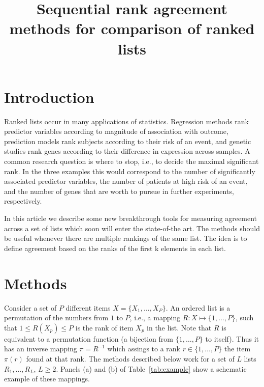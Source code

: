 \documentclass[12pt,a4paper]{article}\usepackage[]{graphicx}\usepackage[]{color}
\begin{document}

\title{Sequential rank agreement methods for comparison of ranked lists}
\author{}

\maketitle

\begin{abstract}

\end{abstract}

\section{Introduction}

Ranked lists occur in many applications of statistics. Regression
methods rank predictor variables according to magnitude of association
with outcome, prediction models rank subjects according to their risk
of an event, and genetic studies rank genes according to their
difference in expression across samples. A common research question is
where to stop, i.e., to decide the maximal significant rank.  In the
three examples this would correspond to the number of significantly
associated predictor variables, the number of patients at high risk of
an event, and the number of genes that are worth to pursue in further
experiments, respectively.

In this article we describe some new breakthrough tools for measuring
agreement across a set of lists which soon will enter the state-of-the
art. The methods should be useful whenever there are multiple rankings
of the same list. The idea is to define agreement based on the ranks
of the first k elements in each list.


\section{Methods}

Consider a set of $P$ different items $X=\{X_1,\dots,X_P\}$. An
ordered list is a permutation of the numbers from $1$ to $P$, i.e., a
mapping $R:X\mapsto \{1,\dots,P\}$, such that $1\le R(X_p)\le P$ is
the rank of item $X_p$ in the list. Note that $R$ is equivalent to a
permutation function (a bijection from $\{1,\dots,P\}$ to
itself). Thus it has an inverse mapping $\pi=R^{-1}$ which assings to
a rank $r\in\{1,\dots,P\}$ the item $\pi(r)$ found at that rank. The
methods described below work for a set of $L$ lists $R_1,\dots,R_L$,
$L\geq2$. Panels (a) and (b) of Table~\ref{tab:example} show a
schematic example of these mappings.
\end{document}
